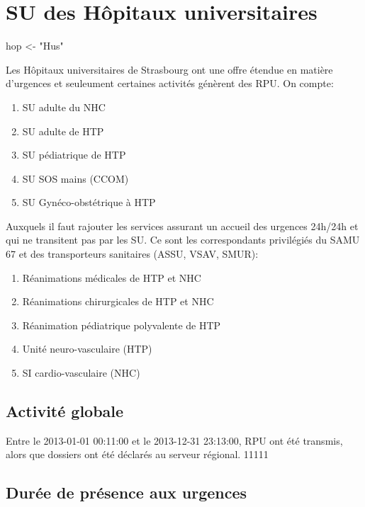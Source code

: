 \documentclass[12pt,english,french,twoside]{book}\usepackage[]{graphicx}\usepackage[]{color}
\begin{document}
\chapter{SU des Hôpitaux universitaires}


hop <- "Hus"


Les Hôpitaux universitaires de Strasbourg ont une offre étendue en matière d'urgences et seuleument certaines activités génèrent des RPU.
On compte:
\begin{enumerate}
  \item SU adulte du NHC
  \item SU adulte de HTP
  \item SU pédiatrique de HTP
  \item SU SOS mains (CCOM)
  \item SU Gynéco-obstétrique à HTP
\end{enumerate}
Auxquels il faut rajouter les services assurant un accueil des urgences 24h/24h et qui ne transitent pas par les SU. Ce sont les correspondants privilégiés du SAMU 67 et des transporteurs sanitaires (ASSU, VSAV, SMUR):
\begin{enumerate}
  \item Réanimations médicales de HTP et NHC
  \item Réanimations chirurgicales de HTP et NHC
  \item Réanimation pédiatrique polyvalente de HTP
  \item Unité neuro-vasculaire (HTP)
  \item SI cardio-vasculaire (NHC)
\end{enumerate}

\section{Activité globale}



Entre le 2013-01-01 00:11:00 et le 2013-12-31 23:13:00,  RPU ont été transmis, alors que  dossiers ont été déclarés au serveur régional. 
11111

\section*{Durée de présence aux urgences}
\end{document}
